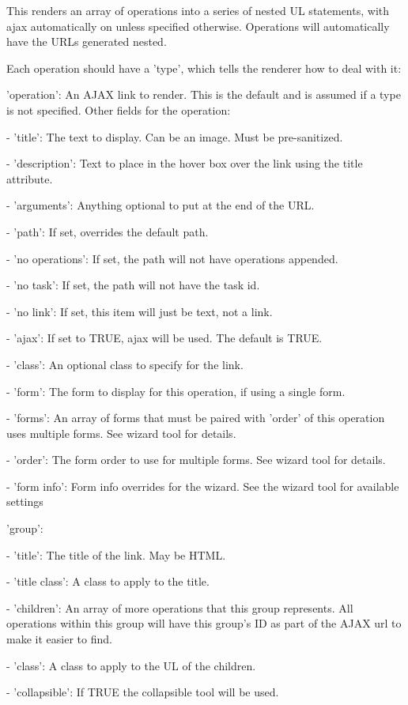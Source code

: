 This renders an array of operations into a series of nested UL statements, with ajax automatically on unless specified otherwise. Operations will automatically have the URLs generated nested.

Each operation should have a 'type', which tells the renderer how to deal with it:
\begin{DoxyItemize}
\item 'operation': An AJAX link to render. This is the default and is assumed if a type is not specified. Other fields for the operation:
\item -\/ 'title': The text to display. Can be an image. Must be pre-\/sanitized.
\item -\/ 'description': Text to place in the hover box over the link using the title attribute.
\item -\/ 'arguments': Anything optional to put at the end of the URL.
\item -\/ 'path': If set, overrides the default path.
\item -\/ 'no operations': If set, the path will not have operations appended.
\item -\/ 'no task': If set, the path will not have the task id.
\item -\/ 'no link': If set, this item will just be text, not a link.
\item -\/ 'ajax': If set to TRUE, ajax will be used. The default is TRUE.
\item -\/ 'class': An optional class to specify for the link.
\item -\/ 'form': The form to display for this operation, if using a single form.
\item -\/ 'forms': An array of forms that must be paired with 'order' of this operation uses multiple forms. See wizard tool for details.
\item -\/ 'order': The form order to use for multiple forms. See wizard tool for details.
\item -\/ 'form info': Form info overrides for the wizard. See the wizard tool for available settings
\item 'group':
\item -\/ 'title': The title of the link. May be HTML.
\item -\/ 'title class': A class to apply to the title.
\item -\/ 'children': An array of more operations that this group represents. All operations within this group will have this group's ID as part of the AJAX url to make it easier to find.
\item -\/ 'class': A class to apply to the UL of the children.
\item -\/ 'collapsible': If TRUE the collapsible tool will be used. 
\end{DoxyItemize}\hypertarget{page__manager_8admin_8inc_a0cebbb105c27764a960d2acfacd484bf}{
}
